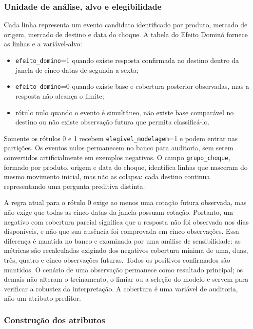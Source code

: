 \documentclass[12pt,a4paper]{article}
\begin{document}
\subsubsection{Unidade de análise, alvo e elegibilidade}

Cada linha representa um evento candidato identificado por produto, mercado de
origem, mercado de destino e data do choque. A tabela do Efeito Dominó fornece
as linhas e a variável-alvo:

\begin{itemize}
    \item \texttt{efeito\_domino}=1 quando existe resposta confirmada no destino
    dentro da janela de cinco datas de segunda a sexta;
    \item \texttt{efeito\_domino}=0 quando existe base e cobertura posterior
    observadas, mas a resposta não alcança o limite;
    \item rótulo nulo quando o evento é simultâneo, não existe base comparável
    no destino ou não existe observação futura que permita classificá-lo.
\end{itemize}

Somente os rótulos 0 e 1 recebem
\texttt{elegivel\_modelagem}=1 e podem entrar nas partições. Os eventos nulos
permanecem no banco para auditoria, sem serem convertidos artificialmente em
exemplos negativos. O campo \texttt{grupo\_choque}, formado por produto, origem
e data do choque, identifica linhas que nasceram do mesmo movimento inicial,
mas não as colapsa: cada destino continua representando uma pergunta preditiva
distinta.

A regra atual para o rótulo 0 exige ao menos uma cotação futura observada, mas
não exige que todas as cinco datas da janela possuam cotação. Portanto, um
negativo com cobertura parcial significa que a resposta não foi observada nos
dias disponíveis, e não que sua ausência foi comprovada em cinco observações.
Essa diferença é mantida no banco e examinada por uma análise de sensibilidade:
as métricas são recalculadas exigindo dos negativos cobertura mínima de uma,
duas, três, quatro e cinco observações futuras. Todos os positivos confirmados
são mantidos. O cenário de uma observação permanece como resultado principal;
os demais não alteram o treinamento, o limiar ou a seleção do modelo e servem
para verificar a robustez da interpretação. A cobertura é uma variável de
auditoria, não um atributo preditor.

\subsubsection{Construção dos atributos}
\end{document}
